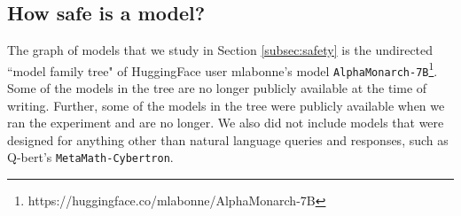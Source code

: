 \documentclass[11pt]{article}
\begin{document}





\subsection{How safe is a model?}
\label{app:safety}

The graph of models that we study in Section \ref{subsec:safety} is the undirected ``model family tree" of HuggingFace user mlabonne's model \texttt{AlphaMonarch-7B}\footnote{https://huggingface.co/mlabonne/AlphaMonarch-7B}.
Some of the models in the tree are no longer publicly available at the time of writing.
Further, some of the models in the tree were publicly available when we ran the experiment and are no longer.
We also did not include models that were designed for anything other than natural language queries and responses, such as Q-bert's \texttt{MetaMath-Cybertron}.
\end{document}
